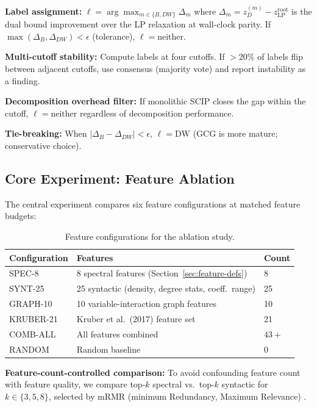 \documentclass[12pt]{article}
\begin{document}
\textbf{Label assignment:} $\ell = \arg\max_{m \in \{B, DW\}} \Delta_m$
where $\Delta_m = z_D^{(m)} - z_{\mathrm{LP}}^{\mathrm{root}}$ is the dual
bound improvement over the LP relaxation at wall-clock parity.  If
$\max(\Delta_B, \Delta_{DW}) < \epsilon$ (tolerance), $\ell = \text{neither}$.

\textbf{Multi-cutoff stability:} Compute labels at four cutoffs.  If $> 20\%$
of labels flip between adjacent cutoffs, use consensus (majority vote) and
report instability as a finding.

\textbf{Decomposition overhead filter:} If monolithic SCIP closes the gap
within the cutoff, $\ell = \text{neither}$ regardless of decomposition
performance.

\textbf{Tie-breaking:} When $|\Delta_B - \Delta_{DW}| < \epsilon$,
$\ell = \text{DW}$ (GCG is more mature; conservative choice).

\subsection{Core Experiment: Feature Ablation}
\label{sec:ablation}

The central experiment compares six feature configurations at matched
feature budgets:

\begin{table}[ht]
\centering
\caption{Feature configurations for the ablation study.}
\label{tab:configs}
\begin{tabular}{@{}lll@{}}
\toprule
Configuration & Features & Count \\
\midrule
SPEC-8 & 8 spectral features (Section~\ref{sec:feature-defs}) & 8 \\
SYNT-25 & 25 syntactic (density, degree stats, coeff.\ range) & 25 \\
GRAPH-10 & 10 variable-interaction graph features & 10 \\
KRUBER-21 & Kruber et al.\ (2017) feature set & 21 \\
COMB-ALL & All features combined & $43+$ \\
RANDOM & Random baseline & 0 \\
\bottomrule
\end{tabular}
\end{table}

\textbf{Feature-count-controlled comparison:} To avoid confounding feature
count with feature quality, we compare top-$k$ spectral vs.\ top-$k$
syntactic for $k \in \{3, 5, 8\}$, selected by mRMR (minimum Redundancy,
Maximum Relevance) \citep{peng2005feature}.
\end{document}
